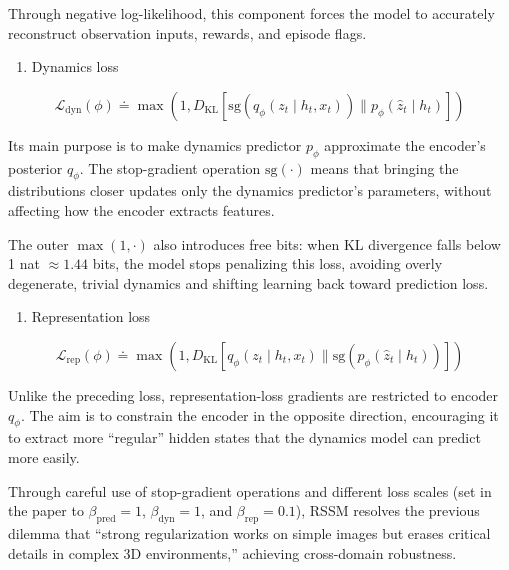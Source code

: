 Through negative log-likelihood, this component forces the model to accurately reconstruct observation inputs, rewards, and episode flags.

\begin{enumerate}
\def\labelenumi{(\arabic{enumi})}
\setcounter{enumi}{1}
\tightlist
\item
  Dynamics loss
\end{enumerate}

\[
\mathcal{L}_{\mathrm{dyn}}(\phi)
\doteq
\max\left(
1,
D_{\mathrm{KL}}\left[
\mathrm{sg}(q_{\phi}(z_t \mid h_t, x_t))
\parallel
p_{\phi}(\hat{z}_t \mid h_t)
\right]
\right)
\]

Its main purpose is to make dynamics predictor \(p_{\phi}\) approximate the encoder's posterior \(q_{\phi}\). The stop-gradient operation \(\mathrm{sg}(\cdot)\) means that bringing the distributions closer updates only the dynamics predictor's parameters, without affecting how the encoder extracts features.

The outer \(\max(1, \cdot)\) also introduces free bits: when KL divergence falls below 1 nat \(\approx 1.44\) bits, the model stops penalizing this loss, avoiding overly degenerate, trivial dynamics and shifting learning back toward prediction loss.

\begin{enumerate}
\def\labelenumi{(\arabic{enumi})}
\setcounter{enumi}{2}
\tightlist
\item
  Representation loss
\end{enumerate}

\[
\mathcal{L}_{\mathrm{rep}}(\phi)
\doteq
\max\left(
1,
D_{\mathrm{KL}}\left[
q_{\phi}(z_t \mid h_t, x_t)
\parallel
\mathrm{sg}(p_{\phi}(\hat{z}_t \mid h_t))
\right]
\right)
\]

Unlike the preceding loss, representation-loss gradients are restricted to encoder \(q_{\phi}\). The aim is to constrain the encoder in the opposite direction, encouraging it to extract more ``regular'' hidden states that the dynamics model can predict more easily.

Through careful use of stop-gradient operations and different loss scales (set in the paper to \(\beta_{\mathrm{pred}} = 1\), \(\beta_{\mathrm{dyn}} = 1\), and \(\beta_{\mathrm{rep}} = 0.1\)), RSSM resolves the previous dilemma that ``strong regularization works on simple images but erases critical details in complex 3D environments,'' achieving cross-domain robustness.

